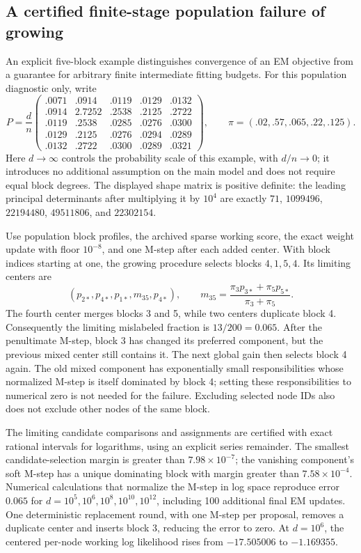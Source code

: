 \subsection{A certified finite-stage population failure of growing}
\label{sec:population_growing_failure}
An explicit five-block example distinguishes convergence of an EM objective
from a guarantee for arbitrary finite intermediate fitting budgets. For this
population diagnostic only, write
\begin{equation}
 P=\frac d n
 \begin{pmatrix}
 .0071&.0914&.0119&.0129&.0132\\
 .0914&2.7252&.2538&.2125&.2722\\
 .0119&.2538&.0285&.0276&.0300\\
 .0129&.2125&.0276&.0294&.0289\\
 .0132&.2722&.0300&.0289&.0321
 \end{pmatrix},\qquad
 \pi=(.02,.57,.065,.22,.125).
 \label{eq:population_growing_example}
\end{equation}
Here $d\to\infty$ controls the probability scale of this example, with
$d/n\to0$; it introduces no additional assumption on the main model and
does not require equal block degrees. The displayed shape matrix is positive
definite: the leading principal determinants after multiplying it by
$10^4$ are exactly $71$, $1099496$, $22194480$, $49511806$, and $22302154$.

Use population block profiles, the archived sparse working score, the exact
weight update with floor $10^{-8}$, and one M-step after each added center.
With block indices starting at one, the growing procedure selects blocks
$4,1,5,4$. Its limiting centers are
\[
 (p_{2*},p_{4*},p_{1*},m_{35},p_{4*}),\qquad
 m_{35}=\frac{\pi_3p_{3*}+\pi_5p_{5*}}{\pi_3+\pi_5}.
\]
The fourth center merges blocks 3 and 5, while two centers duplicate block
4. Consequently the limiting mislabeled fraction is $13/200=0.065$.
After the penultimate M-step, block 3 has changed its preferred component,
but the previous mixed center still contains it. The next global gain then
selects block 4 again. The old mixed component has exponentially small
responsibilities whose normalized M-step is itself dominated by block 4;
setting these responsibilities to numerical zero is not needed for the
failure. Excluding selected node IDs also does not exclude other nodes of
the same block.

The limiting candidate comparisons and assignments are certified with exact
rational intervals for logarithms, using an explicit series remainder. The
smallest candidate-selection margin is greater than $7.98\times10^{-7}$;
the vanishing component's soft M-step has a unique dominating block with
margin greater than $7.58\times10^{-4}$. Numerical calculations that normalize
the M-step in log space reproduce error $0.065$ for
$d=10^5,10^6,10^8,10^{10},10^{12}$, including 100 additional final EM updates.
One deterministic replacement round, with one M-step per proposal, removes
a duplicate center and inserts block 3, reducing the error to zero. At
$d=10^6$, the centered per-node working log likelihood rises from
$-17.505006$ to $-1.169355$.

